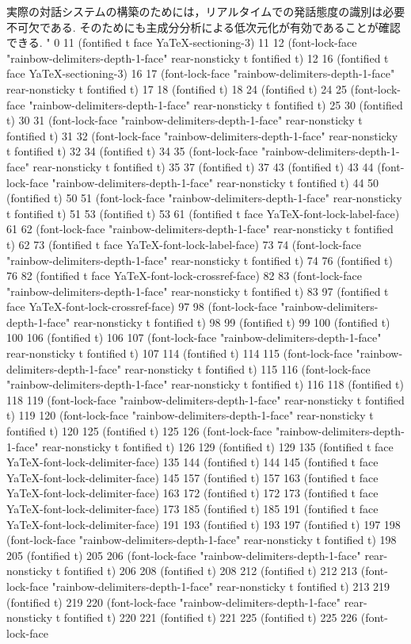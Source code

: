 実際の対話システムの構築のためには，リアルタイムでの発話態度の識別は必要不可欠である.
そのためにも主成分分析による低次元化が有効であることが確認できる.
" 0 11 (fontified t face YaTeX-sectioning-3) 11 12 (font-lock-face "rainbow-delimiters-depth-1-face" rear-nonsticky t fontified t) 12 16 (fontified t face YaTeX-sectioning-3) 16 17 (font-lock-face "rainbow-delimiters-depth-1-face" rear-nonsticky t fontified t) 17 18 (fontified t) 18 24 (fontified t) 24 25 (font-lock-face "rainbow-delimiters-depth-1-face" rear-nonsticky t fontified t) 25 30 (fontified t) 30 31 (font-lock-face "rainbow-delimiters-depth-1-face" rear-nonsticky t fontified t) 31 32 (font-lock-face "rainbow-delimiters-depth-1-face" rear-nonsticky t fontified t) 32 34 (fontified t) 34 35 (font-lock-face "rainbow-delimiters-depth-1-face" rear-nonsticky t fontified t) 35 37 (fontified t) 37 43 (fontified t) 43 44 (font-lock-face "rainbow-delimiters-depth-1-face" rear-nonsticky t fontified t) 44 50 (fontified t) 50 51 (font-lock-face "rainbow-delimiters-depth-1-face" rear-nonsticky t fontified t) 51 53 (fontified t) 53 61 (fontified t face YaTeX-font-lock-label-face) 61 62 (font-lock-face "rainbow-delimiters-depth-1-face" rear-nonsticky t fontified t) 62 73 (fontified t face YaTeX-font-lock-label-face) 73 74 (font-lock-face "rainbow-delimiters-depth-1-face" rear-nonsticky t fontified t) 74 76 (fontified t) 76 82 (fontified t face YaTeX-font-lock-crossref-face) 82 83 (font-lock-face "rainbow-delimiters-depth-1-face" rear-nonsticky t fontified t) 83 97 (fontified t face YaTeX-font-lock-crossref-face) 97 98 (font-lock-face "rainbow-delimiters-depth-1-face" rear-nonsticky t fontified t) 98 99 (fontified t) 99 100 (fontified t) 100 106 (fontified t) 106 107 (font-lock-face "rainbow-delimiters-depth-1-face" rear-nonsticky t fontified t) 107 114 (fontified t) 114 115 (font-lock-face "rainbow-delimiters-depth-1-face" rear-nonsticky t fontified t) 115 116 (font-lock-face "rainbow-delimiters-depth-1-face" rear-nonsticky t fontified t) 116 118 (fontified t) 118 119 (font-lock-face "rainbow-delimiters-depth-1-face" rear-nonsticky t fontified t) 119 120 (font-lock-face "rainbow-delimiters-depth-1-face" rear-nonsticky t fontified t) 120 125 (fontified t) 125 126 (font-lock-face "rainbow-delimiters-depth-1-face" rear-nonsticky t fontified t) 126 129 (fontified t) 129 135 (fontified t face YaTeX-font-lock-delimiter-face) 135 144 (fontified t) 144 145 (fontified t face YaTeX-font-lock-delimiter-face) 145 157 (fontified t) 157 163 (fontified t face YaTeX-font-lock-delimiter-face) 163 172 (fontified t) 172 173 (fontified t face YaTeX-font-lock-delimiter-face) 173 185 (fontified t) 185 191 (fontified t face YaTeX-font-lock-delimiter-face) 191 193 (fontified t) 193 197 (fontified t) 197 198 (font-lock-face "rainbow-delimiters-depth-1-face" rear-nonsticky t fontified t) 198 205 (fontified t) 205 206 (font-lock-face "rainbow-delimiters-depth-1-face" rear-nonsticky t fontified t) 206 208 (fontified t) 208 212 (fontified t) 212 213 (font-lock-face "rainbow-delimiters-depth-1-face" rear-nonsticky t fontified t) 213 219 (fontified t) 219 220 (font-lock-face "rainbow-delimiters-depth-1-face" rear-nonsticky t fontified t) 220 221 (fontified t) 221 225 (fontified t) 225 226 (font-lock-face 